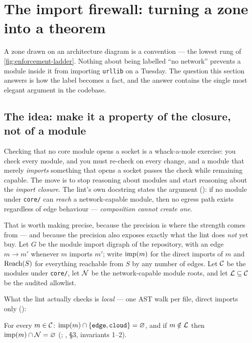 \section{The import firewall: turning a zone into a theorem}
\label{sec:firewall}

A zone drawn on an architecture diagram is a convention --- the lowest rung of
\autoref{fig:enforcement-ladder}. Nothing about \zoneA{} being labelled ``no
network'' prevents a module inside it from importing \texttt{urllib} on a Tuesday.
The question this section answers is how the label becomes a fact, and the answer
contains the single most elegant argument in the codebase.

\subsection*{The idea: make it a property of the closure, not of a module}

Checking that no core module opens a socket is a whack-a-mole exercise: you check
every module, and you must re-check on every change, and a module that merely
\emph{imports} something that opens a socket passes the check while remaining
capable. The move is to stop reasoning about modules and start reasoning about the
\emph{import closure}. The lint's own docstring states the argument
(): if no module under \texttt{core/} can
\emph{reach} a network-capable module, then no egress path exists regardless of
edge behaviour --- \emph{composition cannot create one}.

That is worth making precise, because the precision is where the strength comes
from --- and because the precision also exposes exactly what the lint does
\emph{not} yet buy. Let $G$ be the module import digraph of the repository, with an
edge $m \to m'$ whenever $m$ imports $m'$; write $\operatorname{imp}(m)$ for the direct
imports of $m$ and $\operatorname{Reach}(S)$ for everything reachable from $S$ by any number of
edges. Let $\mathcal{C}{}$ be the modules under \texttt{core/}, let $\mathcal{N}{}$ be
the network-capable module roots, and let $\mathcal{L}{} \subseteq \mathcal{C}{}$ be the
audited allowlist.

What the lint actually checks is \emph{local} --- one AST walk per file, direct
imports only ():

\begin{invariant}
\label{inv:firewall}
For every $m \in \mathcal{C}{}$: $\operatorname{imp}(m) \cap \{\texttt{edge},\texttt{cloud}\}
= \varnothing$, and if $m \notin \mathcal{L}{}$ then
$\operatorname{imp}(m) \cap \mathcal{N}{} = \varnothing$
(; ,
\S 3, invariants 1--2).
\end{invariant}

